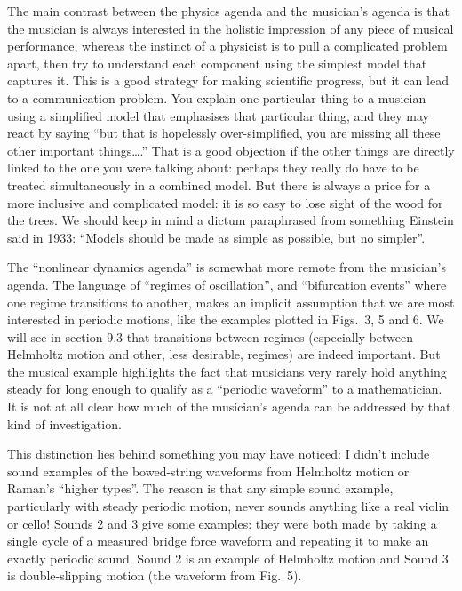   The main contrast between the physics agenda and the musician’s agenda is 
  that the musician is always interested in the holistic impression of any 
  piece of musical performance, whereas the instinct of a physicist is to pull 
  a complicated problem apart, then try to understand each component using the 
  simplest model that captures it. This is a good strategy for making 
  scientific progress, but it can lead to a communication problem. You explain 
  one particular thing to a musician using a simplified model that emphasises 
  that particular thing, and they may react by saying “but that is hopelessly 
  over-simplified, you are missing all these other important things….” That is 
  a good objection if the other things are directly linked to the one you were 
  talking about: perhaps they really do have to be treated simultaneously in a 
  combined model. But there is always a price for a more inclusive and 
  complicated model: it is so easy to lose sight of the wood for the trees. We 
  should keep in mind a dictum paraphrased from something Einstein said in 
  1933: “Models should be made as simple as possible, but no simpler”. 

  The “nonlinear dynamics agenda” is somewhat more remote from the musician’s 
  agenda. The language of “regimes of oscillation”, and “bifurcation events” 
  where one regime transitions to another, makes an implicit assumption that we 
  are most interested in periodic motions, like the examples plotted in Figs.\ 
  3, 5 and 6. We will see in section 9.3 that transitions between regimes 
  (especially between Helmholtz motion and other, less desirable, regimes) are 
  indeed important. But the musical example highlights the fact that musicians 
  very rarely hold anything steady for long enough to qualify as a “periodic 
  waveform” to a mathematician. It is not at all clear how much of the 
  musician’s agenda can be addressed by that kind of investigation. 

  This distinction lies behind something you may have noticed: I didn’t include 
  sound examples of the bowed-string waveforms from Helmholtz motion or Raman’s 
  “higher types”. The reason is that any simple sound example, particularly 
  with steady periodic motion, never sounds anything like a real violin or 
  cello! Sounds 2 and 3 give some examples: they were both made by taking a 
  single cycle of a measured bridge force waveform and repeating it to make an 
  exactly periodic sound. Sound 2 is an example of Helmholtz motion and Sound 3 
  is double-slipping motion (the waveform from Fig.\ 5). 

